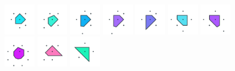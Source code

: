 \documentclass[text.tex]{subfiles}
\begin{document}
\begin{figure}[h!]
\includegraphics[width=0.12\textwidth]{img/results/octagon/octagon_116421_(-5_4alpha_4)_005.pdf}
\includegraphics[width=0.12\textwidth]{img/results/octagon/octagon_116421_(-5_4alpha_4)_006.pdf}
\includegraphics[width=0.12\textwidth]{img/results/octagon/octagon_116421_(-5_4alpha_4)_007.pdf}
\includegraphics[width=0.12\textwidth]{img/results/octagon/octagon_116421_(-5_4alpha_4)_008.pdf}
\includegraphics[width=0.12\textwidth]{img/results/octagon/octagon_116421_(-5_4alpha_4)_009.pdf}
\includegraphics[width=0.12\textwidth]{img/results/octagon/octagon_116421_(-5_4alpha_4)_010.pdf}
\includegraphics[width=0.12\textwidth]{img/results/octagon/octagon_116421_(-5_4alpha_4)_011.pdf}
\includegraphics[width=0.12\textwidth]{img/results/octagon/octagon_116421_(-5_4alpha_4)_012.pdf}
\includegraphics[width=0.12\textwidth]{img/results/octagon/octagon_116421_(-5_4alpha_4)_013.pdf}
\includegraphics[width=0.12\textwidth]{img/results/octagon/octagon_116421_(-5_4alpha_4)_014.pdf}
\end{figure}
\end{document}
